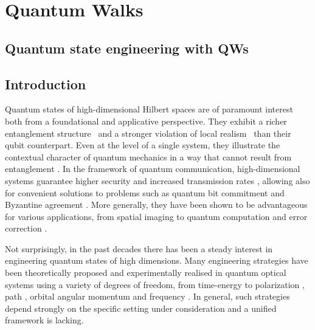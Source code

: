 
\chapter{Quantum Walks}
\label{sec:quantum_walks}

\section{Quantum state engineering with QWs}


\section{Introduction}
Quantum states of high-dimensional Hilbert spaces are of paramount interest both from a foundational and applicative perspective. They exhibit a richer entanglement structure~\cite{horodecki2009quantum} and a stronger violation of local realism~\cite{brunner2014bell} than their qubit counterpart. Even at the level of a single system, they illustrate the contextual character of quantum mechanics in a way that cannot result from entanglement \cite{lapkiewicz2011experimental}. 
In the framework of quantum communication, high-dimensional systems guarantee higher security and increased transmission rates \cite{bechmannpasquinucci2000quantum, cerf2002security, bru2002optimal, acin2003security, karimipour2002quantum, durt2004security, nunn2013largealphabet, mower2013highdimensional, lee2014entanglementbased, zhong2015photonefficient}, allowing also for convenient solutions to problems such as quantum bit commitment \cite{langford2004measuring} and  Byzantine agreement \cite{fitzi2001quantum}.
More generally, they have been shown to be advantageous for various applications,
from spatial imaging \cite{howland2013efficient} to quantum computation \cite{bartlett2002quantum, ralph2007efficient} and error correction \cite{campbell2012magicstate}.

Not surprisingly, in the past decades there has been a steady interest in engineering quantum states of high dimensions. %
Many engineering strategies have been theoretically proposed and experimentally realised in quantum optical systems using a variety of degrees of freedom, from time-energy \cite{thew2004belltype, bessire2014versatile} to polarization \cite{bogdanov2004qutrit}, path \cite{osullivanhale2005pixel}, orbital angular momentum \cite{mair2001entanglement, mclaren2012entangled, krenn2013entangled, krenn2014generation, zhang2016engineering} and frequency \cite{bernhard2013shaping, jin2016simple}. In general, such strategies depend strongly on the specific setting under consideration and a unified framework is lacking. 

